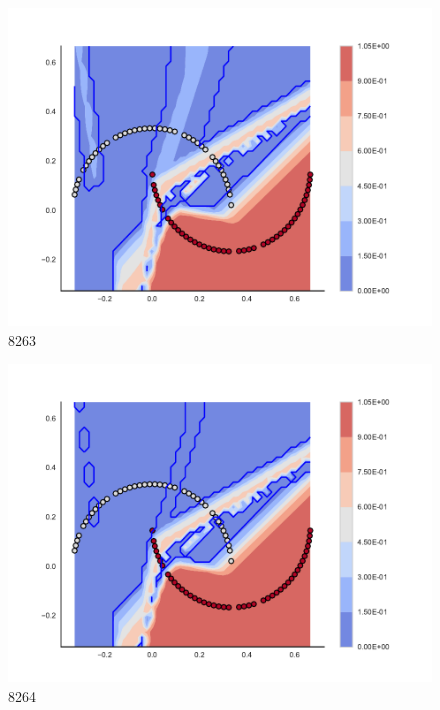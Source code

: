 \begin{subfigure}[b]{0.09\textwidth}
    \includegraphics[clip, trim=2.35cm 1.75cm 4.5cm 0cm,width=\textwidth]{img/convergence/8263.pdf}
    \caption{8263}
    \label{fig:convergence_8263}
\end{subfigure}
%
\begin{subfigure}[b]{0.09\textwidth}
    \includegraphics[clip, trim=2.35cm 1.75cm 4.5cm 0cm,width=\textwidth]{img/convergence/8264.pdf}
    \caption{8264}
    \label{fig:convergence_8264}
\end{subfigure}
%
